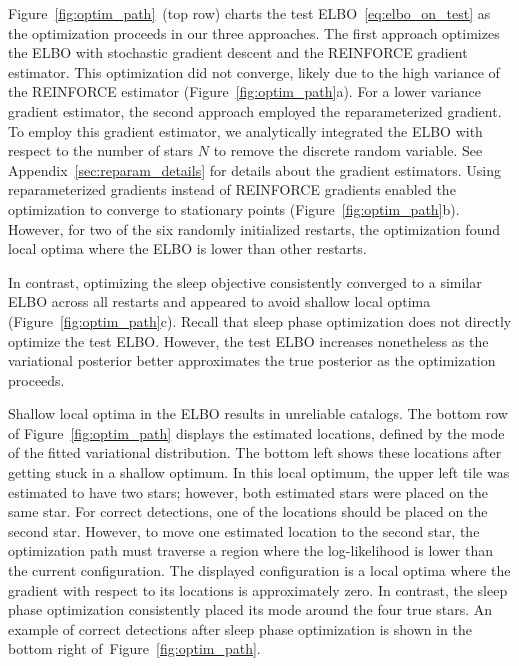 Figure~\ref{fig:optim_path}~(top row) charts the test ELBO~\eqref{eq:elbo_on_test} as the optimization proceeds in our three approaches.
The first approach optimizes the ELBO with stochastic gradient descent and the REINFORCE gradient estimator.
This optimization did not converge, likely due to the high variance of the REINFORCE estimator (Figure~\ref{fig:optim_path}a). 
For a lower variance gradient estimator, the second approach employed the reparameterized gradient. To employ this gradient estimator, we analytically integrated the ELBO with respect to the number of stars $N$ to remove the discrete random variable. 
See Appendix~\ref{sec:reparam_details} for details about the gradient estimators. 
Using reparameterized gradients instead of REINFORCE gradients enabled the optimization to converge to stationary points (Figure~\ref{fig:optim_path}b). 
However, for two of the six randomly initialized restarts, 
the optimization found local optima where the ELBO is lower than other restarts. 

In contrast, optimizing the sleep objective consistently converged to a similar ELBO across all restarts and appeared to avoid shallow local optima (Figure~\ref{fig:optim_path}c).
Recall that sleep phase optimization does not directly optimize the test ELBO. However, the test ELBO increases nonetheless as the variational posterior better approximates the true posterior as the optimization proceeds. 

Shallow local optima in the ELBO results in unreliable catalogs. 
The bottom row of Figure~\ref{fig:optim_path} displays the estimated locations, defined by the mode of the fitted variational distribution. 
The bottom left shows these locations after getting stuck in a shallow optimum. 
In this local optimum, the upper left tile was estimated to have two stars; however, both estimated stars were placed on the same star. 
For correct detections, one of the locations should be placed on the second star.
However, to move one estimated location to the second star, the optimization path must traverse a region where the log-likelihood is lower than the current configuration. 
The displayed configuration is a local optima where the gradient with respect to its locations is approximately zero.
In contrast, the sleep phase optimization consistently placed its mode around the four true stars. 
An example of correct detections after sleep phase optimization is shown in the bottom right of~Figure~\ref{fig:optim_path}.

